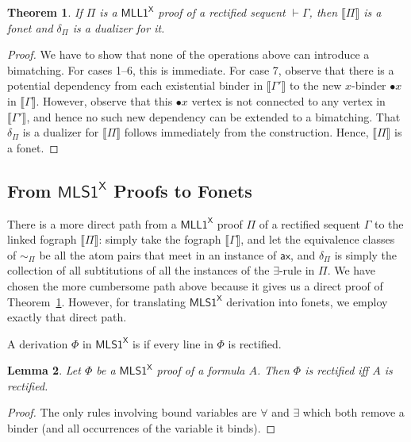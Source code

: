 \documentclass[conference,twosided,10pt]{IEEEtran}
\newtheorem{thm}{Theorem}%
\newtheorem{lemma}[thm]{Lemma}
\theoremstyle{definition}
\newcommand{\Deri}{\Phi}
\newcommand*{\FOMLL}{\mathsf{MLL1^X}}
\newcommand*{\FOMLS}{\mathsf{MLS1^X}}
\newcommand{\ax}{\mathsf{ax}}
\newcommand{\sqn}[1]{\vdash#1}
\newcommand{\single}[1]{\bullet#1}
\newcommand{\fographof}[1]{\llbracket#1\rrbracket}
\newcommand{\graphof}[1]{\llbracket#1\rrbracket}
\newcommand{\dsubstof}[1]{\delta_{#1}}
\newcommand{\linkingof}[1]{\sim_{#1}}
\begin{document}
\begin{thm}
  \label{thm:MLL1->fonet}
  If $\Pi$ is a $\FOMLL$ proof of a rectified sequent $\sqn\Gamma$,
  then $\fographof\Pi$ is a fonet and $\dsubstof\Pi$ is a dualizer for it.
\end{thm}

\begin{proof}
  We have to show that none of the operations above can introduce a
  bimatching. For cases 1--6, this is immediate. For case 7, observe
  that there is a potential dependency from each existential binder in
  $\graphof{\Gamma'}$ to the new $x$-binder $\single x$ in
  $\graphof{\Gamma}$. However, observe that this $\single x$ vertex is
  not connected to any vertex in $\graphof{\Gamma'}$, and hence no
  such new dependency can be extended to a bimatching. That
  $\dsubstof\Pi$ is a dualizer for $\fographof\Pi$ follows immediately
  from the construction. Hence,  $\fographof\Pi$ is a fonet.
\end{proof}

\subsection{From $\FOMLS$ Proofs to Fonets}

There is a more direct path from a $\FOMLL$ proof $\Pi$ of a rectified
sequent $\Gamma$ to the linked fograph $\fographof\Pi$: simply take
the fograph $\graphof\Gamma$, and let the equivalence classes of
$\linkingof\Pi$ be all the atom pairs that meet in an instance of
$\ax$, and $\dsubstof\Pi$ is simply the collection of all subtitutions
of all the instances of the $\exists$-rule in $\Pi$.
%
We have chosen the more cumbersome path above because it gives us a
direct proof of Theorem~\ref{thm:MLL1->fonet}.
%
However, for translating $\FOMLS$ derivation into fonets, we employ
exactly that direct path.

A derivation $\Deri$ in $\FOMLS$ is  if every line in $\Deri$ is
rectified.

\begin{lemma}
  Let  $\Deri$ be a $\FOMLS$ proof of a formula $A$. Then $\Deri$ is rectified iff $A$ is rectified.
\end{lemma}

\begin{proof}
   The only rules involving bound
   variables are $\forall$ and $\exists$ which both remove a binder (and
   all occurrences of the variable it binds).
\end{proof}
\end{document}
